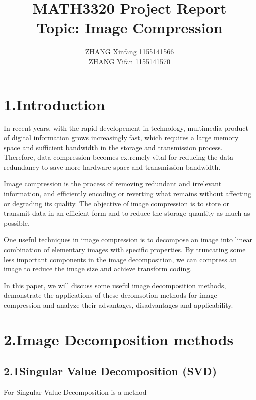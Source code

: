 \documentclass[12pt]{article}
\title{MATH3320 Project Report\\Topic: Image Compression}
\author{ZHANG Xinfang 1155141566\\ZHANG Yifan 1155141570}
\date{\displaydate{date}}
\begin{document}
\maketitle
\newpage


\section*{1.\quad Introduction}
\begin{flushleft}
In recent years, with the rapid developement in technology, multimedia product 
of digital information grows increasingly fast, which requires a large memory space 
and sufficient bandwidth in the storage and transmission process. 
Therefore, data compression becomes extremely vital for reducing the data 
redundancy to save more hardware space and transmission bandwidth. 

Image compression is the process of removing redundant and irrelevant information, 
and efficiently encoding or reverting what remains without affecting or degrading its quality. 
The objective of image compression is to store or transmit data in an efficient form
and to reduce the storage quantity as much as possible.

One useful techniques in image compression is to decompose an image into linear combination 
of elementary images with specific properties. By truncating some less important components 
in the image decomposition, we can compress an image to reduce the image size 
and achieve transform coding. 

In this paper, we will discuss some useful image decomposition methods, demonstrate the 
applications of these decomsotion methods for image compression and analyze their advantages,
disadvantages and applicability.
\end{flushleft}


\section*{2.\quad Image Decomposition methods}
\subsection*{2.1\quad Singular Value Decomposition (SVD)}
For 
Singular Value Decomposition is a method 
\end{document}
